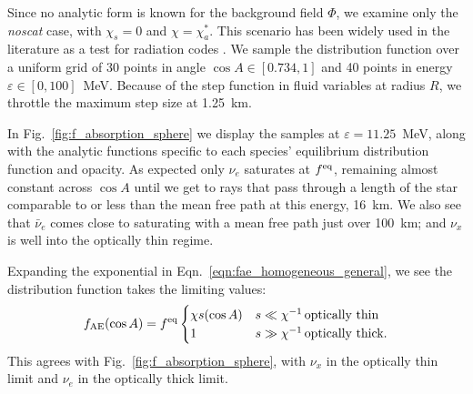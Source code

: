 \documentclass[aps,floatfix,prd,superscriptaddress,twocolumn]{revtex4-1}
\begin{document}
Since no analytic form is known for the background field $\Phi$,
we examine only the \emph{noscat} case,
with $\chi_s=0$ and $\chi=\chi_a^{*}$.
This scenario has been widely used in the literature as a test for
radiation codes
\cite{smit1997-two_moment,abdi2012-monte_carlo,fouc2015-m1_nsbh}.
We sample the distribution function over a uniform grid of
30 points in angle $\cos A \in [0.734,1]$ and
40 points in energy $\varepsilon \in [0,100]$~MeV.
Because of the step function in fluid variables at radius $R$,
we throttle the maximum step size at 1.25~km.

In Fig.~\ref{fig:f_absorption_sphere} we display the samples at
$\varepsilon=11.25$~MeV, along with the analytic functions
specific to each species' equilibrium distribution function and opacity.
As expected only $\nu_e$ saturates at $f^{\rm eq}$, remaining almost
constant across $\cos A$ until we get to rays that pass through a length
of the star comparable to or less than the mean free path at this energy,
16~km. We also see that $\bar{\nu}_e$ comes close to saturating with
a mean free path just over 100~km; and $\nu_x$ is well into the optically
thin regime.

Expanding the exponential in Eqn.~\ref{eqn:fae_homogeneous_general},
we see the distribution function takes the limiting values:
\begin{equation}
  \label{eqn:fae_homogeneous_limits}
  f_{\rm AE}(\cos A) = f^{\rm eq}
  \begin{cases}
    \chi s(\cos A) & s \ll \chi^{-1}\,\textrm{optically thin}\\
    1                  & s \gg \chi^{-1}\,\textrm{optically thick}.
  \end{cases}
\end{equation}
This agrees with Fig.~\ref{fig:f_absorption_sphere}, with $\nu_x$
in the optically thin limit and $\nu_e$ in the optically thick limit.
\end{document}
